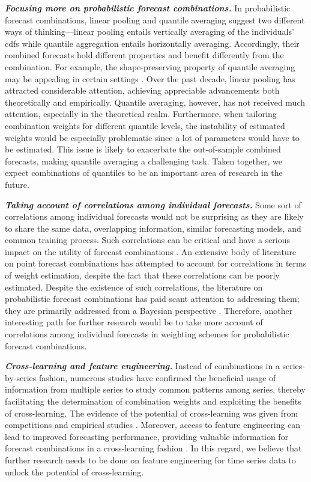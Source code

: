 \documentclass[11pt]{article}
\begin{document}
\textbf{\textit{Focusing more on probabilistic forecast combinations.}} In probabilistic forecast combinations, linear pooling and quantile averaging suggest two different ways of thinking---linear pooling entails vertically averaging of the individuals' cdfs while quantile aggregation entails horizontally averaging. Accordingly, their combined forecasts hold different properties and benefit differently from the combination. For example, the shape-preserving property of quantile averaging may be appealing in certain settings \citep{Lichtendahl2013-rt}. Over the past decade, linear pooling has attracted considerable attention, achieving appreciable advancements both theoretically and empirically. Quantile averaging, however, has not received much attention, especially in the theoretical realm. Furthermore, when tailoring combination weights for different quantile levels, the instability of estimated weights would be especially problematic since a lot of parameters would have to be estimated. This issue is likely to exacerbate the out-of-sample combined forecasts, making quantile averaging a challenging task. Taken together, we expect combinations of quantiles to be an important area of research in the future.

\textbf{\textit{Taking account of correlations among individual forecasts.}} Some sort of correlations among individual forecasts would not be surprising as they are likely to share the same data, overlapping information, similar forecasting models, and common training process. Such correlations can be critical and have a serious impact on the utility of forecast combinations \citep{De_Menezes2000-vd}. An extensive body of literature on point forecast combinations has attempted to account for correlations in terms of weight estimation, despite the fact that these correlations can be poorly estimated. Despite the existence of such correlations, the literature on probabilistic forecast combinations has paid scant attention to addressing them; they are primarily addressed from a Bayesian perspective \citep[e.g.,][]{Winkler1981-bn,McAlinn2019-kn}. Therefore, another interesting path for further research would be to take more account of correlations among individual forecasts in weighting schemes for probabilistic forecast combinations.

\textbf{\textit{Cross-learning and feature engineering.}} Instead of combinations in a series-by-series fashion, numerous studies have confirmed the beneficial usage of information from multiple series to study common patterns among series, thereby facilitating the determination of combination weights and exploiting the benefits of cross-learning. The evidence of the potential of cross-learning was given from competitions \citep[e.g.,][]{Makridakis2020-hu,Makridakis2020-fn} and empirical studies \citep[e.g.,][]{Ma2021-np}. Moreover, access to feature engineering can lead to improved forecasting performance, providing valuable information for forecast combinations in a cross-learning fashion \citep{Montero-Manso2020-tq,Kang2021-ol}. In this regard, we believe that further research needs to be done on feature engineering for time series data to unlock the potential of cross-learning.
\end{document}
